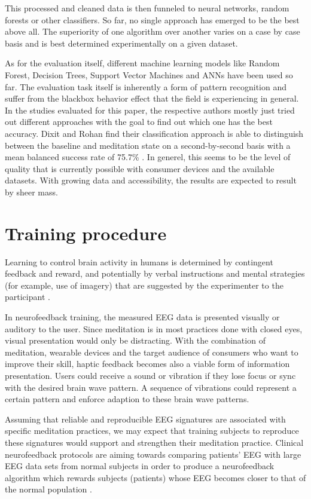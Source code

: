 \documentclass{llncs} %
\begin{document}
This processed and cleaned data is then funneled to neural networks, random forests or other classifiers. So far, no single approach has emerged to be the best above all. The superiority of one algorithm over another varies on a case by case basis and is best determined experimentally on a given dataset. 
\medskip

As for the evaluation itself, different machine learning models like Random Forest, Decision Trees, Support Vector Machines and ANNs have been used so far. The evaluation task itself is inherently a form of pattern recognition and suffer from the blackbox behavior effect that the field is experiencing in general. In the studies evaluated for this paper, the respective authors mostly just tried out different approaches with the goal to find out which one has the best accuracy. 
Dixit and Rohan find their classification approach is able to distinguish between the baseline and meditation state on a second-by-second basis with a mean balanced success rate of 75.7\% \cite{Dixit}. In generel, this seems to be the level of quality that is currently possible with consumer devices and the available datasets. With growing data and accessibility, the results are expected to result by sheer mass.

\section{Training procedure}
Learning to control brain activity in humans is determined by contingent feedback and reward, and potentially by verbal instructions and mental strategies (for example, use of imagery) that are suggested by the experimenter to the participant \cite{Sitaram}. 
\medskip

In neurofeedback training, the measured EEG data is presented visually or auditory to the user. Since meditation is in most practices done with closed eyes, visual presentation would only be distracting. With the combination of meditation, wearable devices and the target audience of consumers who want to improve their skill, haptic feedback becomes also a viable form of information presentation. Users could receive a sound or vibration if they lose focus or sync with the desired brain wave pattern. A sequence of vibrations could represent a certain pattern and enforce adaption to these brain wave patterns.
\medskip

Assuming that reliable and reproducible EEG signatures are associated with specific meditation practices, we may expect that training subjects to reproduce these signatures would support and strengthen their meditation practice.
Clinical neurofeedback protocols are aiming towards comparing patients’ EEG with large EEG data sets from normal subjects in order to produce a neurofeedback algorithm which rewards subjects (patients) whose EEG becomes closer to that of the normal population \cite{brand:del}.
\newpage
\end{document}
